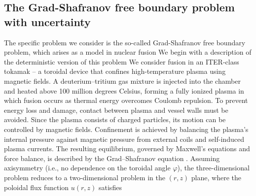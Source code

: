 \subsection{The Grad-Shafranov free boundary problem with uncertainty}\label{sec:Grad-Shafranov}
The specific problem we consider is the so-called Grad-Shafranov free boundary problem, which arises as a model in nuclear fusion
We begin with a description of the deterministic version of this problem
We consider fusion in an ITER-class tokamak -- a toroidal device that confines high-temperature plasma using magnetic fields. A deuterium–tritium gas mixture is injected into the chamber and heated above 100 million degrees Celsius, forming a fully ionized plasma in which fusion occurs as thermal energy overcomes Coulomb repulsion. To prevent energy loss and damage, contact between plasma and vessel walls must be avoided. Since the plasma consists of charged particles, its motion can be controlled by magnetic fields. Confinement is achieved by balancing the plasma’s internal pressure against magnetic pressure from external coils and self-induced plasma currents. The resulting equilibrium, governed by Maxwell’s equations and force balance, is described by the Grad–Shafranov equation \cite{GrRu:1958, LuSc:1957, Shafranov:1958}. Assuming axisymmetry (i.e., no dependence on the toroidal angle $\varphi$), the three-dimensional problem reduces to a two-dimensional problem in the $(r, z)$ plane, where the poloidal flux function $u(r,z)$ satisfies
%
